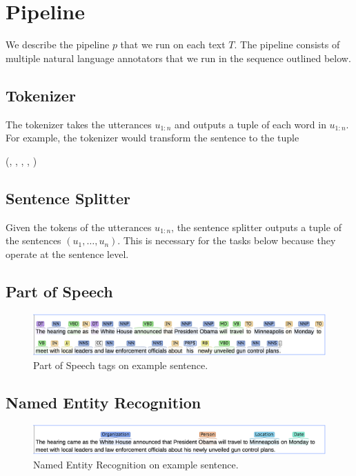 
\section{Pipeline}
We describe the pipeline $p$ that we run on each text $T$. The pipeline
consists of multiple natural language annotators that we run in 
the sequence outlined below.
\citep{manning2014stanford}

\subsection{Tokenizer}
The tokenizer takes the utterances $u_{1:n}$ and outputs a tuple of
each word in $u_{1:n}$. For example, the tokenizer would transform
the sentence  to the tuple
\begin{center}
  (, , , , )
\end{center}
\subsection{Sentence Splitter}
Given the tokens of the utterances $u_{1:n}$, the sentence splitter outputs
a tuple of the sentences $(u_1,\dots,u_n)$. This is necessary
for the tasks below because they operate at the sentence level.
\subsection{Part of Speech}

\begin{figure}
\includegraphics[scale=0.33]{figures/pos.png}
\caption{
\label{fig:pos}
Part of Speech tags on example sentence.
}
\end{figure}

\citet{toutanova2003tagger}
\subsection{Named Entity Recognition}

\begin{figure}
\includegraphics[scale=0.33]{figures/ner.png}
\caption{
\label{fig:ner}
Named Entity Recognition on example sentence.
}
\end{figure}

